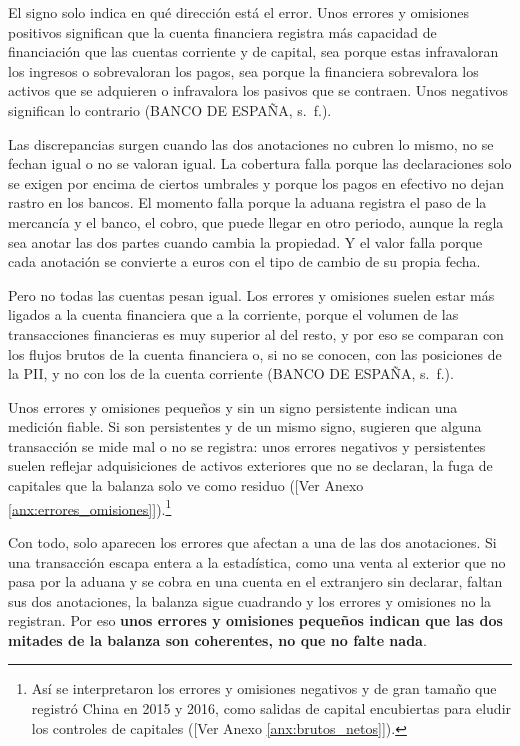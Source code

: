 \documentclass[10pt,a4paper]{article}
\newcommand{\authorfont}[1]{{\fontfamily{EBGaramond-TLF}\selectfont #1}}
\begin{document}
El signo solo indica en qué dirección está el error. Unos errores y omisiones positivos significan que la cuenta financiera registra más capacidad de financiación que las cuentas corriente y de capital, sea porque estas infravaloran los ingresos o sobrevaloran los pagos, sea porque la financiera sobrevalora los activos que se adquieren o infravalora los pasivos que se contraen. Unos negativos significan lo contrario (BANCO DE ESPAÑA, s.~f.).

Las discrepancias surgen cuando las dos anotaciones no cubren lo mismo, no se fechan igual o no se valoran igual. La cobertura falla porque las declaraciones solo se exigen por encima de ciertos umbrales y porque los pagos en efectivo no dejan rastro en los bancos. El momento falla porque la aduana registra el paso de la mercancía y el banco, el cobro, que puede llegar en otro periodo, aunque la regla sea anotar las dos partes cuando cambia la propiedad. Y el valor falla porque cada anotación se convierte a euros con el tipo de cambio de su propia fecha.

Pero no todas las cuentas pesan igual. Los errores y omisiones suelen estar más ligados a la cuenta financiera que a la corriente, porque el volumen de las transacciones financieras es muy superior al del resto, y por eso se comparan con los flujos brutos de la cuenta financiera o, si no se conocen, con las posiciones de la PII, y no con los de la cuenta corriente (BANCO DE ESPAÑA, s.~f.).

Unos errores y omisiones pequeños y sin un signo persistente indican una medición fiable. Si son persistentes y de un mismo signo, sugieren que alguna transacción se mide mal o no se registra: unos errores negativos y persistentes suelen reflejar adquisiciones de activos exteriores que no se declaran, la fuga de capitales que la balanza solo ve como residuo ([\authorfont{Ver Anexo \ref{anx:errores_omisiones}}]).\footnote{%
    Así se interpretaron los errores y omisiones negativos y de gran tamaño que registró China en 2015 y 2016, como salidas de capital encubiertas para eludir los controles de capitales ([\authorfont{Ver Anexo \ref{anx:brutos_netos}}]).
}

Con todo, solo aparecen los errores que afectan a una de las dos anotaciones. Si una transacción escapa entera a la estadística, como una venta al exterior que no pasa por la aduana y se cobra en una cuenta en el extranjero sin declarar, faltan sus dos anotaciones, la balanza sigue cuadrando y los errores y omisiones no la registran. Por eso \textbf{unos errores y omisiones pequeños indican que las dos mitades de la balanza son coherentes, no que no falte nada}.
\end{document}
